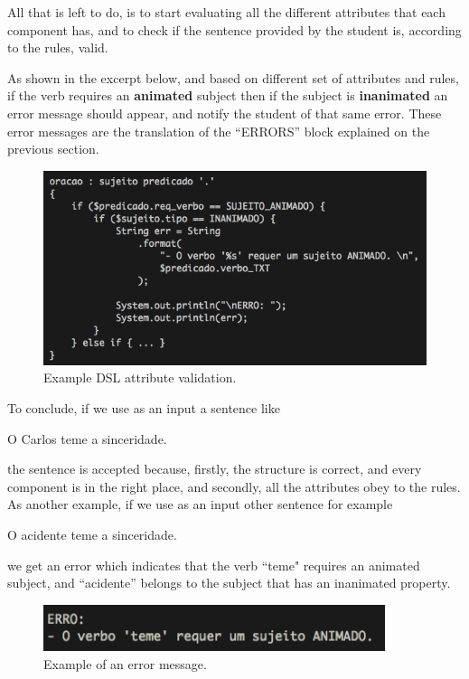 All that is left to do, is to start evaluating all the different attributes that each component has, and to check if the sentence provided by the student is, according to the rules, valid. 

As shown in the excerpt below, and based on different set of attributes and rules, if the verb requires an \textbf{animated} subject then if the subject is \textbf{inanimated} an error message should appear, and notify the student of that same error. These error messages are the translation of the ``ERRORS'' block explained on the previous section.

\begin{figure}[h]
    \centering
    \includegraphics[width=12cm]{images/dsl_validation.png}
    \caption{Example DSL attribute validation.}
    \label{fig:dsl_attribute_validation}
\end{figure}

To conclude, if we use as an input a sentence like
\begin{description}
    O Carlos teme a sinceridade.
\end{description}
the sentence is accepted because, firstly, the structure is correct, and every component is in the right place, and secondly, all the attributes obey to the rules. As another example, if we use as an input other sentence for example \begin{description}
    O acidente teme a sinceridade.
\end{description}
we get an error which indicates that the verb ``teme" requires an animated subject, and ``acidente'' belongs to the subject that has an inanimated property.

\begin{figure}[h]
    \centering
    \includegraphics[width=10cm]{images/animated_subject_error.png}
    \caption{Example of an error message.}
    \label{fig:error_message_dsl}
\end{figure}

